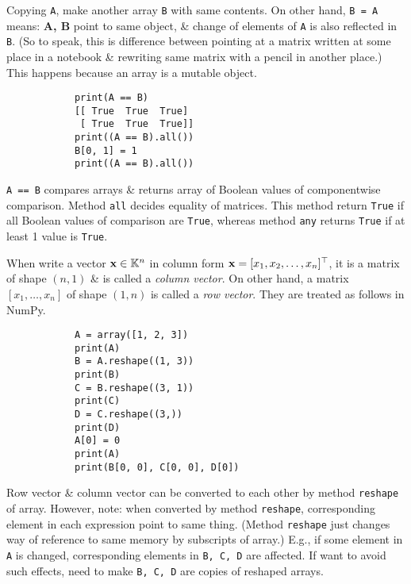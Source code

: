 \documentclass{article}
\begin{document}
\begin{itemize}
\begin{itemize}
\begin{verbatim}
		\end{verbatim}
		Copying {\tt A}, make another array {\tt B} with same contents. On other hand, {\tt B = A} means: {\bf A, B} point to same object, \& change of elements of {\tt A} is also reflected in {\tt B}. (So to speak, this is difference between pointing at a matrix written at some place in a notebook \& rewriting same matrix with a pencil in another place.) This happens because an array is a mutable object.
		\begin{verbatim}
			print(A == B)
			[[ True  True  True]
			 [ True  True  True]]
			print((A == B).all())
			B[0, 1] = 1
			print((A == B).all())
		\end{verbatim}
		{\tt A == B} compares arrays \& returns array of Boolean values of componentwise comparison. Method {\tt all} decides equality of matrices. This method return {\tt True} if all Boolean values of comparison are {\tt True}, whereas method {\tt any} returns {\tt True} if at least 1 value is {\tt True}.
		
		When write a vector ${\bf x}\in\mathbb{K}^n$ in column form ${\bf x} = [x_1,x_2,\ldots,x_n]^\top$, it is a matrix of shape $(n,1)$ \& is called a {\it column vector}. On other hand, a matrix $[x_1,\ldots,x_n]$ of shape $(1,n)$ is called a {\it row vector}. They are treated as follows in NumPy.
		\begin{verbatim}
			A = array([1, 2, 3])
			print(A)
			B = A.reshape((1, 3))
			print(B)
			C = B.reshape((3, 1))
			print(C)
			D = C.reshape((3,))
			print(D)
			A[0] = 0
			print(A)
			print(B[0, 0], C[0, 0], D[0])
		\end{verbatim}
		Row vector \& column vector can be converted to each other by method {\tt reshape} of array. However, note: when converted by method {\tt reshape}, corresponding element in each expression point to same thing. (Method {\tt reshape} just changes way of reference to same memory by subscripts of array.) E.g., if some element in {\tt A} is changed, corresponding elements in {\tt B, C, D} are affected. If want to avoid such effects, need to make {\tt B, C, D} are copies of reshaped arrays.
		

\end{itemize}
\end{itemize}
\end{document}
